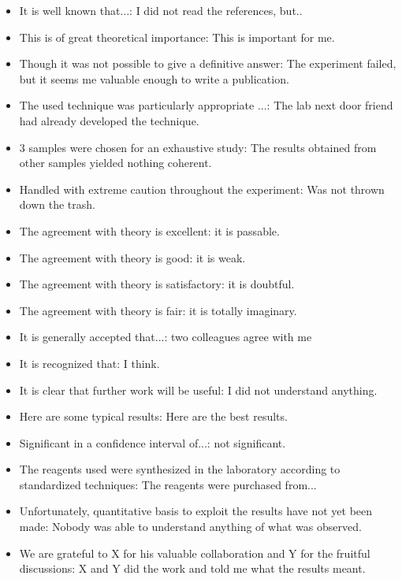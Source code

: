 \begin{itemize}
	\item It is well known that...: I did not read the references, but..

	\item This is of great theoretical importance: This is important for me.

	\item Though it was not possible to give a definitive answer: The experiment failed, but it seems me valuable enough to write a publication.

	\item The used technique was particularly appropriate ...: The lab next door friend had already developed the technique.

	\item 3 samples were chosen for an exhaustive study: The results obtained from other samples yielded nothing coherent.

	\item Handled with extreme caution throughout the experiment: Was not thrown down the trash.

	\item The agreement with theory is excellent: it is passable.

	\item The agreement with theory is good: it is weak.

	\item The agreement with theory is satisfactory: it is doubtful.

	\item The agreement with theory is fair: it is totally imaginary.

	\item It is generally accepted that...: two colleagues agree with me

	\item It is recognized that: I think.

	\item It is clear that further work will be useful: I did not understand anything.

	\item Here are some typical results: Here are the best results.

	\item Significant in a confidence interval of...: not significant.

	\item The reagents used were synthesized in the laboratory according to standardized techniques: The reagents were purchased from...

	\item Unfortunately, quantitative basis to exploit the results have not yet been made: Nobody was able to understand anything of what was observed.

	\item We are grateful to X for his valuable collaboration and Y for the fruitful discussions: X and Y did the work and told me what the results meant.
\end{itemize}

